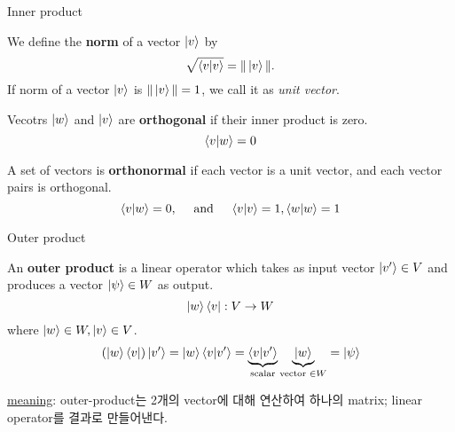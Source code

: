 \documentclass[9pt]{beamer}
\begin{document}
    \begin{frame}{Inner product}
        \begin{definition}[norm]
            We define the \textbf{norm} of a vector $\ket v$ by
            $$\sqrt{\braket{v|v}} = \|\ket v\|.$$
            If norm of a vector $\ket v$ is $\|\ket v\| = 1$, we call it as \textit{unit vector}.
        \end{definition}
        \begin{definition}[orthogonality]
            Vecotrs $\ket w$ and $\ket v$ are \textbf{orthogonal} if their inner product is zero.
            $${\braket{v|w}} = 0$$
        \end{definition}
        \begin{definition}[orthonormal]
            A set of vectors is \textbf{orthonormal} if each vector is a unit vector, and each vector pairs is orthogonal.
            $$\braket{v|w} = 0, \quad \text{ and } \quad  \braket{v|v} = 1, \braket{w|w} = 1$$
        \end{definition}
    \end{frame}

    \begin{frame}{Outer product}
        \begin{definition}
            An \textbf{outer product} is a \alert{linear operator} which takes as input vector $\ket {v'} \in V$ and produces a vector $\ket \psi \in W$ as output.
            $$ \ket{w} \bra{v} : V \rightarrow W$$
            where $\ket w \in W, \ket v \in V$.
            $$(\ket w \bra v) \ket{v'} = \ket w \braket{v|v'} = \underbrace{\braket{v|v'}}_{\text{scalar}} \underbrace{\ket w}_{\text{vector } \in W} = \ket{\psi}$$
        \end{definition}
        \checkmark \underline{meaning}: outer-product는 2개의 vector에 대해 연산하여 하나의 matrix; linear operator를 결과로 만들어낸다.
    \end{frame}
\end{document}
